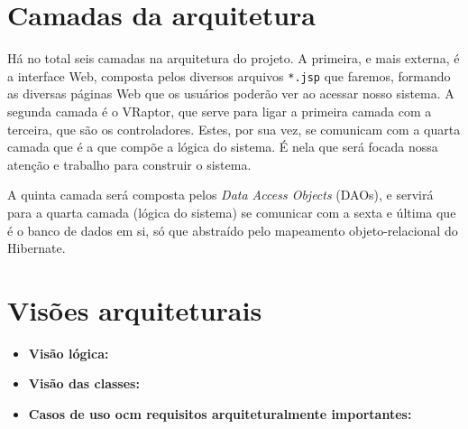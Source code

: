 \documentclass[11pt, a4paper]{article}
\begin{document}
    \section{Camadas da arquitetura}
        Há no total seis camadas na arquitetura do projeto. A primeira, e mais
        externa, é a interface Web, composta pelos diversos arquivos
        \texttt{*.jsp} que faremos, formando as diversas páginas Web que os
        usuários poderão ver ao acessar nosso sistema.
        A segunda camada é o VRaptor, que serve para ligar a primeira camada com
        a terceira, que são os controladores. Estes, por sua vez, se comunicam
        com a quarta camada que é a que compõe a lógica do sistema. É nela que
        será focada nossa atenção e trabalho para construir o sistema.

        A quinta camada será composta pelos \textit{Data Access Objects} (DAOs),
        e servirá para a quarta camada (lógica do sistema) se comunicar com a
        sexta e última que é o banco de dados em si, só que abstraído pelo
        mapeamento objeto-relacional do Hibernate.

    \section{Visões arquiteturais}
        \begin{itemize}
            \item \textbf{Visão lógica:} %
            
            \item \textbf{Visão das classes:} %
            
            \item \textbf{Casos de uso ocm requisitos arquiteturalmente
            importantes:} %
        \end{itemize}
\end{document}
